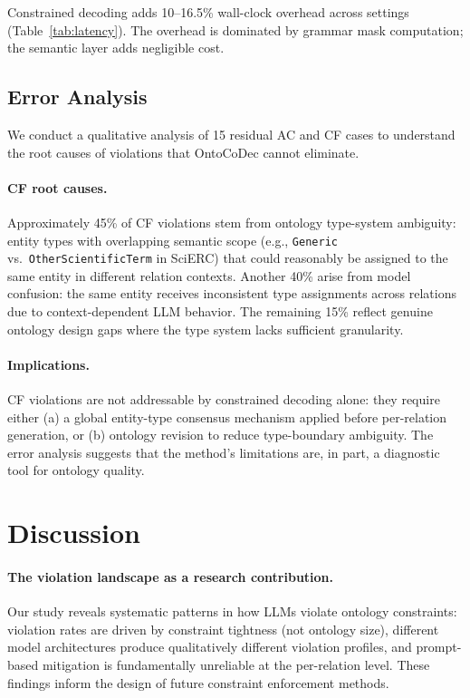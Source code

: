 \documentclass[11pt]{article}
\newcommand{\sys}{OntoCoDec}
\begin{document}
Constrained decoding adds 10--16.5\% wall-clock overhead across settings (Table~\ref{tab:latency}).
The overhead is dominated by grammar mask computation; the semantic layer adds negligible cost.


\subsection{Error Analysis}
\label{sec:error_analysis}

We conduct a qualitative analysis of 15 residual AC and CF cases to understand the root causes of violations that \sys{} cannot eliminate.

\paragraph{CF root causes.}
Approximately 45\% of CF violations stem from ontology type-system ambiguity: entity types with overlapping semantic scope (e.g., \texttt{Generic} vs.\ \texttt{OtherScientificTerm} in SciERC) that could reasonably be assigned to the same entity in different relation contexts.
Another 40\% arise from model confusion: the same entity receives inconsistent type assignments across relations due to context-dependent LLM behavior.
The remaining 15\% reflect genuine ontology design gaps where the type system lacks sufficient granularity.

\paragraph{Implications.}
CF violations are not addressable by constrained decoding alone: they require either (a) a global entity-type consensus mechanism applied before per-relation generation, or (b) ontology revision to reduce type-boundary ambiguity.
The error analysis suggests that the method's limitations are, in part, a diagnostic tool for ontology quality.


\section{Discussion}
\label{sec:discussion}

\paragraph{The violation landscape as a research contribution.}
Our study reveals systematic patterns in how LLMs violate ontology constraints:
violation rates are driven by constraint tightness (not ontology size),
different model architectures produce qualitatively different violation profiles,
and prompt-based mitigation is fundamentally unreliable at the per-relation level.
These findings inform the design of future constraint enforcement methods.
\end{document}
